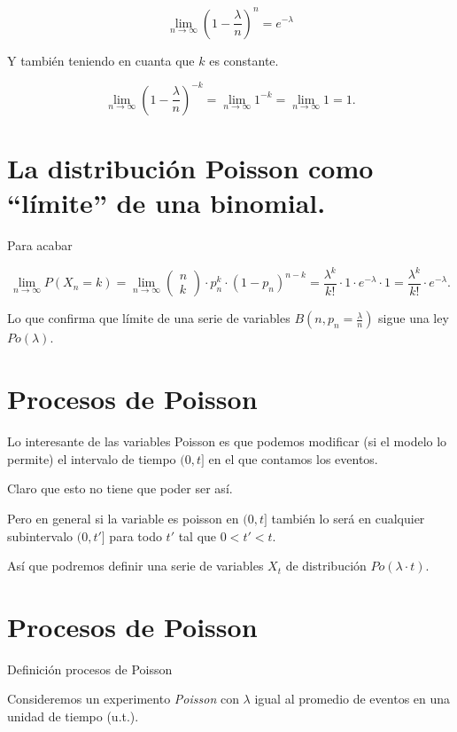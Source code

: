 \documentclass[
  letterpaper,
  DIV=11,
  numbers=noendperiod]{scrreprt}
\begin{document}
\[
\lim_{n\to \infty} \left(1-\frac{\lambda}{n}\right)^{n}=e^{-\lambda}
\]

Y también teniendo en cuanta que \(k\) es constante.

\[
\lim_{n\to \infty} \left(1-\frac{\lambda}{n}\right)^{-k}=\lim_{n\to \infty} 1^{-k}=\lim_{n\to \infty}  1=1.
\]

\section{La distribución Poisson como ``límite'' de una
binomial.}\label{la-distribuciuxf3n-poisson-como-luxedmite-de-una-binomial.-5}

Para acabar

\[
\displaystyle\lim_{n\to\infty} P(X_n=k)=
\lim_{n\to\infty} \left(\begin{array}{c} n\\ k\end{array}\right)
\cdot p_n^k \cdot (1-p_n)^{n-k}= \frac{\lambda^k}{k!}\cdot 1 \cdot e^{-\lambda}\cdot 1=\frac{\lambda^k}{k!}\cdot e^{-\lambda}.
\]

Lo que confirma que límite de una serie de variables
\(B(n,p_n=\frac{\lambda}{n})\) sigue una ley \(Po(\lambda)\).

\section{Procesos de Poisson}\label{procesos-de-poisson}

Lo interesante de las variables Poisson es que podemos modificar (si el
modelo lo permite) el intervalo de tiempo \((0,t]\) en el que contamos
los eventos.

Claro que esto no tiene que poder ser así.

Pero en general si la variable es poisson en \((0,t]\) también lo será
en cualquier subintervalo \((0,t']\) para todo \(t'\) tal que
\(0<t'<t\).

Así que podremos definir una serie de variables \(X_t\) de distribución
\(Po(\lambda\cdot t)\).

\section{Procesos de Poisson}\label{procesos-de-poisson-1}

Definición procesos de Poisson

Consideremos un experimento \emph{Poisson} con \(\lambda\) igual al
promedio de eventos en una unidad de tiempo (u.t.).
\end{document}
